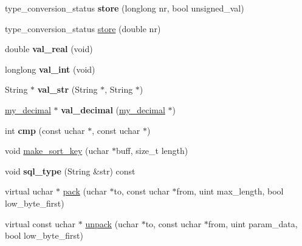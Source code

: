 \begin{DoxyCompactItemize}
\item 
\mbox{\label{classField__string_a38c0df8c1a15e0ef3ff5f4a82fd152ce}} 
type\+\_\+conversion\+\_\+status {\bfseries store} (longlong nr, bool unsigned\+\_\+val)
\item 
type\+\_\+conversion\+\_\+status \mbox{\hyperlink{classField__string_a154a1bcd6578f53da8bccb43cc57cb60}{store}} (double nr)
\item 
\mbox{\label{classField__string_a5e846ae91c7e2478f7b50f3070069a80}} 
double {\bfseries val\+\_\+real} (void)
\item 
\mbox{\label{classField__string_a3f67f8d9013fbcee8958706a3e972260}} 
longlong {\bfseries val\+\_\+int} (void)
\item 
\mbox{\label{classField__string_a7192ad6ae7280acc6eb82a4bb831b68b}} 
String $\ast$ {\bfseries val\+\_\+str} (String $\ast$, String $\ast$)
\item 
\mbox{\label{classField__string_a08f448ec418b3edb8e1908f759127f30}} 
\mbox{\hyperlink{classmy__decimal}{my\+\_\+decimal}} $\ast$ {\bfseries val\+\_\+decimal} (\mbox{\hyperlink{classmy__decimal}{my\+\_\+decimal}} $\ast$)
\item 
\mbox{\label{classField__string_a91fb25508ef43ca2ab9598a2486e2b26}} 
int {\bfseries cmp} (const uchar $\ast$, const uchar $\ast$)
\item 
void \mbox{\hyperlink{classField__string_a0d422b315c798e5281087fa31376921a}{make\+\_\+sort\+\_\+key}} (uchar $\ast$buff, size\+\_\+t length)
\item 
\mbox{\label{classField__string_ae38d154e925b8a5ad3d22694cd54d13c}} 
void {\bfseries sql\+\_\+type} (String \&str) const
\item 
virtual uchar $\ast$ \mbox{\hyperlink{classField__string_a2394757ed93148a4ad7199e93ace382b}{pack}} (uchar $\ast$to, const uchar $\ast$from, uint max\+\_\+length, bool low\+\_\+byte\+\_\+first)
\item 
virtual const uchar $\ast$ \mbox{\hyperlink{classField__string_a2b13c788916d9efdb0683d9c92b0ccbf}{unpack}} (uchar $\ast$to, const uchar $\ast$from, uint param\+\_\+data, bool low\+\_\+byte\+\_\+first)

\end{DoxyCompactItemize}
